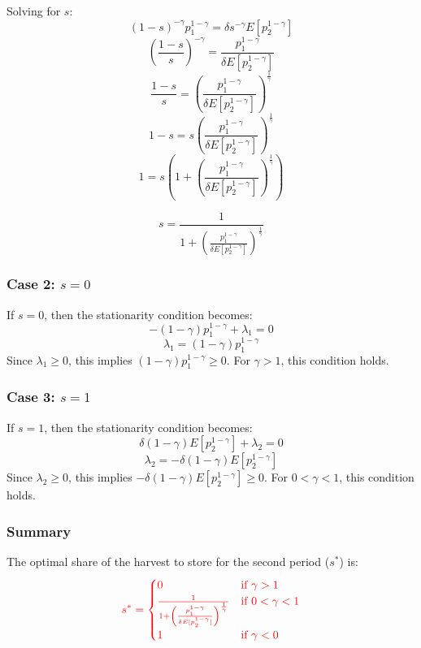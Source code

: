 \documentclass[12pt]{article}
\begin{document}
Solving for \( s \):
\[
(1 - s)^{-\gamma} p_1^{1 - \gamma} = \delta s^{-\gamma} E[p_2^{1 - \gamma}]
\]
\[
\left( \frac{1 - s}{s} \right)^{-\gamma} = \frac{p_1^{1 - \gamma}}{\delta E[p_2^{1 - \gamma}]}
\]
\[
\frac{1 - s}{s} = \left( \frac{p_1^{1 - \gamma}}{\delta E[p_2^{1 - \gamma}]} \right)^{\frac{1}{\gamma}}
\]
\[
1 - s = s \left( \frac{p_1^{1 - \gamma}}{\delta E[p_2^{1 - \gamma}]} \right)^{\frac{1}{\gamma}}
\]
\[
1 = s \left( 1 + \left( \frac{p_1^{1 - \gamma}}{\delta E[p_2^{1 - \gamma}]} \right)^{\frac{1}{\gamma}} \right)
\]

\begin{equation}
    s = \frac{1}{1 + \left( \frac{p_1^{1 - \gamma}}{\delta E[p_2^{1 - \gamma}]} \right)^{\frac{1}{\gamma}}}
\end{equation}




\subsubsection*{Case 2: \( s = 0 \)}

If \( s = 0 \), then the stationarity condition becomes:
\[
-(1 - \gamma) p_1^{1 - \gamma} + \lambda_1 = 0
\]
\[
\lambda_1 = (1 - \gamma) p_1^{1 - \gamma}
\]
Since \(\lambda_1 \geq 0\), this implies \((1 - \gamma) p_1^{1 - \gamma} \geq 0\). For \(\gamma > 1\), this condition holds.

\subsubsection*{Case 3: \( s = 1 \)}

If \( s = 1 \), then the stationarity condition becomes:
\[
\delta\left(1 - \gamma\right) E[p_2^{1 - \gamma}] + \lambda_2 = 0
\]
\[
\lambda_2 = -\delta \left(1 - \gamma\right) E[p_2^{1 - \gamma}]
\]
Since \(\lambda_2 \geq 0\), this implies \(-\delta \left(1 - \gamma\right) E[p_2^{1 - \gamma}] \geq 0\). For \(0 < \gamma < 1\), this condition holds.


\subsubsection*{Summary}
The optimal share of the harvest to store for the second period ($ s^* $) is:
\begin{equation}
    \textcolor{red}{s^* = 
    \begin{cases} 
        0 & \text{if } \gamma > 1 \\
        \frac{1}{1 + \left( \frac{p_1^{1 - \gamma}}{\delta E[p_2^{1 - \gamma}]} \right)^{\frac{1}{\gamma}}} & \text{if } 0 < \gamma < 1 \\
        1 & \text{if } \gamma < 0 
    \end{cases}}
    \label{Eq: KT solution of farmer's max problem}
\end{equation}
\end{document}
